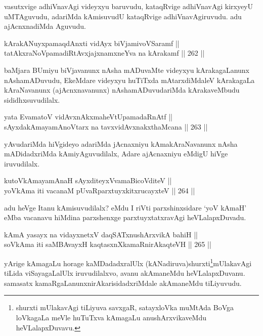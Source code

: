 \begin{artha}
vasutxvige adhiVnavAgi videyxyu baruvudu, kataqRvige adhiVnavAgi
kirxyeyU uMTAguvudu, adariMda kAmisuvudU kataqRvige adhiVnavAgiruvudu.
adu ajAcnxnadiMda Aguvudu.
\end{artha}

\begin{shl}
kArakANuyxpamaqdAnxti vidAyx biVjamivoVSaramf || \\
tatAkxraNoVpamadiRtAvxjajxnamxneYva na kArakamf \hfill || 262 ||  
\end{shl}

\begin{artha}
baMjara BUmiyu biVjavanunx nAsha mADuvaMte videyxyu kArakagaLanunx
nAshamADuvudu, EkeMdare videyxyu huTiTxda mAtarxdiMdaleV
kArakagaLa kAraNavanunx (ajAcnxnavanunx) nAshamADuvudariMda
kArakaveMbudu sididhxsuvudilalx.
\end{artha}

\begin{shl}
yata EvamatoV vidAvxnAkxmaheVtUpamadaRnAtf || \\
sAyxdakAmayamAnoV\s tarx na tavxvidAvxnakxthaMcana \hfill || 263 ||  
\end{shl}

\begin{artha}
yAvudariMda hiVgideyo adariMda jAcnaxniyu kAmakAraNavanunx nAsha mADidadxriMda kAmiyAguvudilalx, Adare ajAcnaxniyu eMdigU hiVge iruvudilalx.
\end{artha}

\begin{shl}
kutoV\s kAmayamAnaH sAyxditeyxVvamaBicoVditeV || \\
yoV\s kAma iti vacanaM pUvaRparxtuyxkitxrucayxteV \hfill || 264 ||  
\end{shl}

\begin{artha}
adu heVge Itanu kAmisuvudilalx? eMdu I riVti parxshinxsidare `yoV\s
kAmaH' eMba vacanavu hiMdina parxshenxge parxtuyxtatxravAgi heVLalapxDuvadu.
\end{artha}


\begin{shl}
kAmA yasayx na vidayxnetxV daqSATxnushArxvikA bahiH || \\
soV\s kAma iti saMBAvayxH kaqtasxnXkamaRnirAkaqteVH \hfill || 265 ||   
\end{shl}

\begin{artha}
yArige kAmagaLu horage kaMDadadxralUlx (kANadiruva)\break shurxti\footnote{shurxti mUlakavAgi tiLiyuva savxgaR, satayxloVka muMtAda BoVga loVkagaLa meVle huTuTxva kAmagaLu anushArxvikaveMdu heVLalapxDuvavu.}mUlakavAgi tiLida viSayagaLalUlx iruvudilalxvo, avanu akAmaneMdu
heVLalapxDuvanu. samasatx kamaRgaLanunx\break nirAkarisidadxriMdale
akAmaneMdu tiLiyuvudu.
\end{artha}

